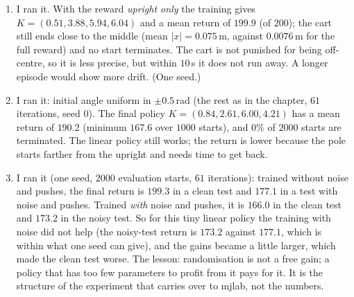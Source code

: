 \begin{enumerate}[label=\textbf{\ansnum.\arabic*}]
  \item I ran it. With the reward \emph{upright only} the training gives $K=(0.51, 3.88, 5.94, 6.04)$ and a mean return of $199.9$ (of $200$); the cart still ends close to the middle (mean $|x|=0.075$\,m, against $0.0076$\,m for the full reward) and no start terminates. The cart is not punished for being off-centre, so it is less precise, but within $10$\,s it does not run away. A longer episode would show more drift. (One seed.)
  \item I ran it: initial angle uniform in $\pm0.5$\,rad (the rest as in the chapter, $61$ iterations, seed $0$). The final policy $K=(0.84,2.61,6.00,4.21)$ has a mean return of $190.2$ (minimum $167.6$ over $1000$ starts), and $0\%$ of $2000$ starts are terminated. The linear policy still works; the return is lower because the pole starts farther from the upright and needs time to get back.
  \item I ran it (one seed, $2000$ evaluation starts, $61$ iterations): trained without noise and pushes, the final return is $199.3$ in a clean test and $177.1$ in a test with noise and pushes. Trained \emph{with} noise and pushes, it is $166.0$ in the clean test and $173.2$ in the noisy test. So for this tiny linear policy the training with noise did not help (the noisy-test return is $173.2$ against $177.1$, which is within what one seed can give), and the gains became a little larger, which made the clean test worse. The lesson: randomisation is not a free gain; a policy that has too few parameters to profit from it pays for it. It is the structure of the experiment that carries over to mjlab, not the numbers.
\end{enumerate}
